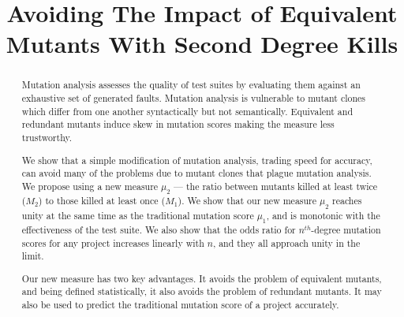 \documentclass[conference]{IEEEtran}
\def\mytitle{Avoiding The Impact of Equivalent Mutants With Second Degree Kills}
\begin{document}
\title{\mytitle}


\author{
}
 









\maketitle


\begin{abstract}
Mutation analysis assesses the quality of test suites by
evaluating them against an exhaustive set of generated faults.
Mutation analysis is vulnerable to mutant clones which differ from one
another syntactically but not semantically. Equivalent and
redundant mutants induce skew in mutation scores making the measure
less trustworthy.

We show that a simple modification of mutation analysis,
trading speed for accuracy, can avoid many of the problems due to
mutant clones that plague mutation analysis. We propose using
a new measure $\mu_2$ --- the ratio between mutants killed at least
twice ($M_2$) to those killed at least once ($M_1$). We show that
our new measure $\mu_2$ reaches unity at the same time as the
traditional mutation score $\mu_1$, and is monotonic with the
effectiveness of the test suite. We also show that the
odds ratio for $n^{th}$-degree mutation scores for any project increases
linearly with $n$, and they all approach unity in the limit.

Our new measure has two key advantages. It avoids the problem of
equivalent mutants, and being defined statistically, it also avoids
the problem of redundant mutants. It may also be used to predict
the traditional mutation score of a project accurately.
 \end{abstract}





\IEEEpeerreviewmaketitle
\end{document}
